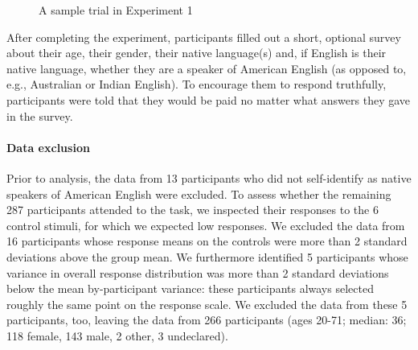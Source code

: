 \documentclass[11pt,fleqn]{article}
\newcommand{\6}{\mbox{$[\hspace*{-.6mm}[$}}
\newcommand{\9}{\mbox{$]\hspace*{-.6mm}]$}}
\begin{document}
\begin{figure}[h!]
\begin{center}
\end{center}
\caption{A sample trial in Experiment 1}\label{fig-trial-exp1}
\end{figure}

After completing the experiment, participants filled out a short, optional survey about their age, their gender, their native language(s) and, if English is their native language, whether they are a speaker of American English (as opposed to, e.g., Australian or Indian English). To encourage them to respond truthfully, participants were told that they would be paid no matter what answers they gave in the survey.

\paragraph{Data exclusion}
Prior to analysis, the data from 13 participants who did not self-identify as native speakers of American English were excluded. To assess whether the remaining 287 participants attended to the task, we inspected their responses to the 6 control stimuli, for which we expected low responses. We excluded the data from 16 participants whose response means on the controls were more than 2 standard deviations above the group mean. We furthermore identified 5 participants whose variance in overall response distribution was more than 2 standard deviations below the mean by-participant variance: these participants always selected roughly the same point on the response scale. We excluded the data from these 5 participants, too, leaving the data from 266 participants (ages 20-71; median: 36; 118 female, 143 male, 2 other, 3 undeclared).
\end{document}
